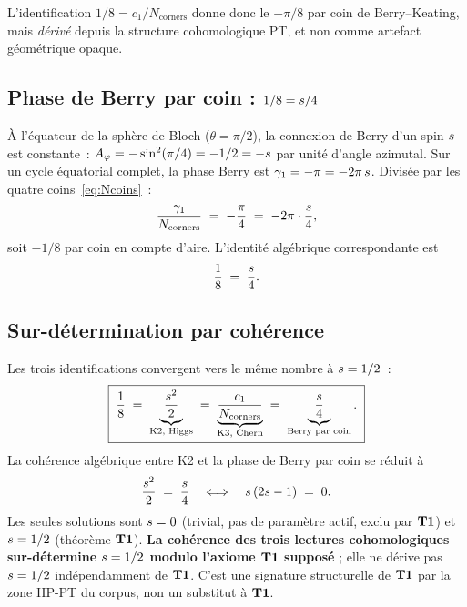 L'identification $1/8 = c_1/N_{\mathrm{corners}}$ donne donc le $-\pi/8$
par coin de Berry--Keating, mais \emph{dérivé} depuis la structure
cohomologique PT, et non comme artefact géométrique opaque.

\subsection{Phase de Berry par coin : $1/8 = s/4$}
\label{sec:phase_berry}

À l'équateur de la sphère de Bloch ($\theta = \pi/2$), la connexion de
Berry d'un spin-$s$ est constante~:
$A_\varphi = -\sin^{2}(\pi/4) = -1/2 = -s$ par unité d'angle
azimutal. Sur un cycle équatorial complet, la phase Berry est
$\gamma_1 = -\pi = -2\pi\,s$. Divisée par les quatre
coins~\eqref{eq:Ncoins}~:
\begin{equation}
\dfrac{\gamma_1}{N_{\mathrm{corners}}} \;=\; -\dfrac{\pi}{4} \;=\; -2\pi \cdot \dfrac{s}{4},
\label{eq:s_sur_4}
\end{equation}
soit $-1/8$ par coin en compte d'aire. L'identité algébrique
correspondante est
\begin{equation}
\dfrac{1}{8} \;=\; \dfrac{s}{4}.
\label{eq:un_huitieme_sur_4}
\end{equation}

\subsection{Sur-détermination par cohérence}
\label{sec:surdetermination_coherence}

Les trois identifications convergent vers le même nombre à $s = 1/2$~:
\begin{equation}
\boxed{\;
\dfrac{1}{8} \;=\; \underbrace{\dfrac{s^{2}}{2}}_{\text{K2, Higgs}} \;=\; \underbrace{\dfrac{c_1}{N_{\mathrm{corners}}}}_{\text{K3, Chern}} \;=\; \underbrace{\dfrac{s}{4}}_{\text{Berry par coin}}.\;}
\label{eq:triple_identification}
\end{equation}
La cohérence algébrique entre K2 et la phase de Berry par coin se réduit
à
\begin{equation}
\dfrac{s^{2}}{2} \;=\; \dfrac{s}{4} \quad\Longleftrightarrow\quad s\,(2s - 1) \;=\; 0.
\label{eq:coherence_K2_Berry}
\end{equation}
Les seules solutions sont $s = 0$ (trivial, pas de paramètre actif,
exclu par $\textbf{T1}$) et $s = 1/2$ (théorème $\textbf{T1}$). \textbf{La
cohérence des trois lectures cohomologiques sur-détermine $s = 1/2$
modulo l'axiome $\textbf{T1}$ supposé} ; elle ne dérive pas $s = 1/2$
indépendamment de $\textbf{T1}$. C'est une signature structurelle de $\textbf{T1}$
par la zone HP-PT du corpus, non un substitut à $\textbf{T1}$.

